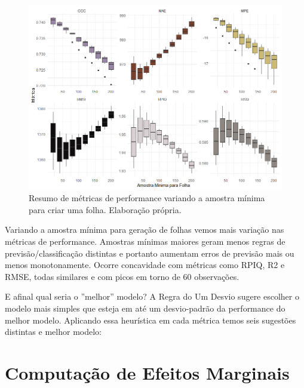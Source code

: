 \begin{figure}[H]
    \centering
    \includegraphics[scale = .70]{imagens/crossv_min.png}
    \caption{Resumo de métricas de performance variando a amostra mínima para criar uma folha. Elaboração própria.}
\end{figure}


Variando a amostra mínima para geração de folhas vemos mais variação nas métricas de performance. Amostras mínimas maiores geram menos regras de previsão/classificação distintas e portanto aumentam erros de previsão mais ou menos monotonamente. Ocorre concavidade com métricas como RPIQ, R2 e RMSE, todas similares e com picos em torno de 60 observações. 

E afinal qual seria o ''melhor'' modelo? A Regra do Um Desvio \cite{breiman1984classification} sugere escolher o modelo mais simples que esteja em até um desvio-padrão da performance do melhor modelo. Aplicando essa heurística em cada métrica temos seis sugestões distintas e melhor modelo:





\section{Computação de Efeitos Marginais}

